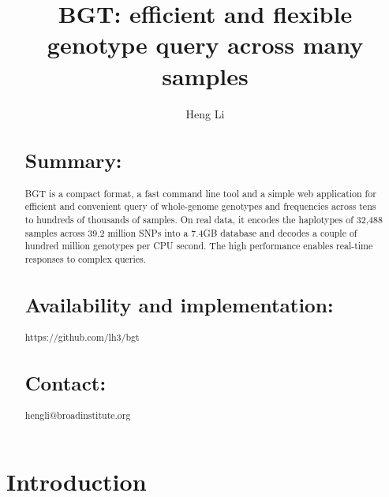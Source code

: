 \documentclass{bioinfo}
\begin{document}

\title[Large-scale Genotype Query]{BGT: efficient and flexible genotype query across many samples}

\author[Li]{Heng Li}

\address{Broad Institute, 7 Cambridge Center, Cambridge, MA 02142, USA}

\maketitle

\begin{abstract}
\section{Summary:} BGT is a compact format, a fast command line tool and a
simple web application for efficient and convenient query of whole-genome
genotypes and frequencies across tens to hundreds of thousands of samples.
On real data, it encodes the haplotypes of 32,488 samples across 39.2
million SNPs into a 7.4GB database and decodes a couple of hundred million
genotypes per CPU second. The high performance enables real-time responses to
complex queries.

\section{Availability and implementation:} https://github.com/lh3/bgt

\section{Contact:} hengli@broadinstitute.org
\end{abstract}

\section{Introduction}
\end{document}
